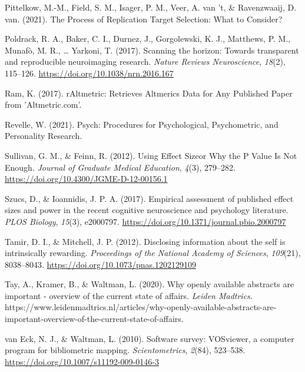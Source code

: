 \documentclass[
  english,
  man,floatsintext]{apa6}
\newlength{\cslhangindent}
\newlength{\cslentryspacingunit} %
\newenvironment{CSLReferences}[2] %
 {%
  \setlength{\parindent}{0pt}
  \ifodd #1
  \let\oldpar\par
  \def\par{\hangindent=\cslhangindent\oldpar}
  \fi
  \setlength{\parskip}{#2\cslentryspacingunit}
 }%
 {}
\begin{document}
\begin{CSLReferences}{1}{0}
\leavevmode{}%
Pittelkow, M.-M., Field, S. M., Isager, P. M., Veer, A. van 't, \& Ravenzwaaij, D. van. (2021). The {Process} of {Replication Target Selection}: {What} to {Consider}?

\leavevmode{}%
Poldrack, R. A., Baker, C. I., Durnez, J., Gorgolewski, K. J., Matthews, P. M., Munafò, M. R., \ldots{} Yarkoni, T. (2017). Scanning the horizon: Towards transparent and reproducible neuroimaging research. \emph{Nature Reviews Neuroscience}, \emph{18}(2), 115--126. \url{https://doi.org/10.1038/nrn.2016.167}

\leavevmode{}%
Ram, K. (2017). {rAltmetric}: {Retrieves Altmerics Data} for {Any Published Paper} from '{Altmetric}.com'.

\leavevmode{}%
Revelle, W. (2021). Psych: {Procedures} for {Psychological}, {Psychometric}, and {Personality Research}.

\leavevmode{}%
Sullivan, G. M., \& Feinn, R. (2012). Using {Effect Size}\textemdash or {Why} the {P Value Is Not Enough}. \emph{Journal of Graduate Medical Education}, \emph{4}(3), 279--282. \url{https://doi.org/10.4300/JGME-D-12-00156.1}

\leavevmode{}%
Szucs, D., \& Ioannidis, J. P. A. (2017). Empirical assessment of published effect sizes and power in the recent cognitive neuroscience and psychology literature. \emph{PLOS Biology}, \emph{15}(3), e2000797. \url{https://doi.org/10.1371/journal.pbio.2000797}

\leavevmode{}%
Tamir, D. I., \& Mitchell, J. P. (2012). Disclosing information about the self is intrinsically rewarding. \emph{Proceedings of the National Academy of Sciences}, \emph{109}(21), 8038--8043. \url{https://doi.org/10.1073/pnas.1202129109}

\leavevmode{}%
Tay, A., Kramer, B., \& Waltman, L. (2020). Why openly available abstracts are important - overview of the current state of affairs. \emph{Leiden Madtrics}. https://www.leidenmadtrics.nl/articles/why-openly-available-abstracts-are-important-overview-of-the-current-state-of-affairs.

\leavevmode{}%
van Eck, N. J., \& Waltman, L. (2010). Software survey: {VOSviewer}, a computer program for bibliometric mapping. \emph{Scientometrics}, \emph{2}(84), 523--538. \url{https://doi.org/10.1007/s11192-009-0146-3}


\end{CSLReferences}
\end{document}
